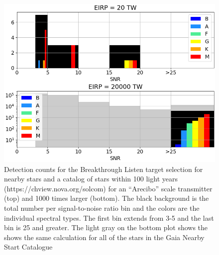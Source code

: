 \begin{figure}
    \centering
    \includegraphics[width=0.75\linewidth]{figures/catcounts.png}
    \caption{Detection counts for the Breakthrough Listen target selection for nearby stars \citep{2017PASP..129e4501I} and a catalog of stars within 100 light years (https://chview.nova.org/solcom) for an ``Arecibo'' scale transmitter (top) and 1000 times larger (bottom).  The black background is the total number per signal-to-noise ratio bin and the colors are the individual spectral types.  The first bin extends from 3-5 and the last bin is 25 and greater.  The light gray on the bottom plot shows the shows the same calculation for all of the stars in the Gaia Nearby Start Catalogue \citep{2021A&A...649A...6G}}
    \label{fig:isaacsonetal}
\end{figure}


